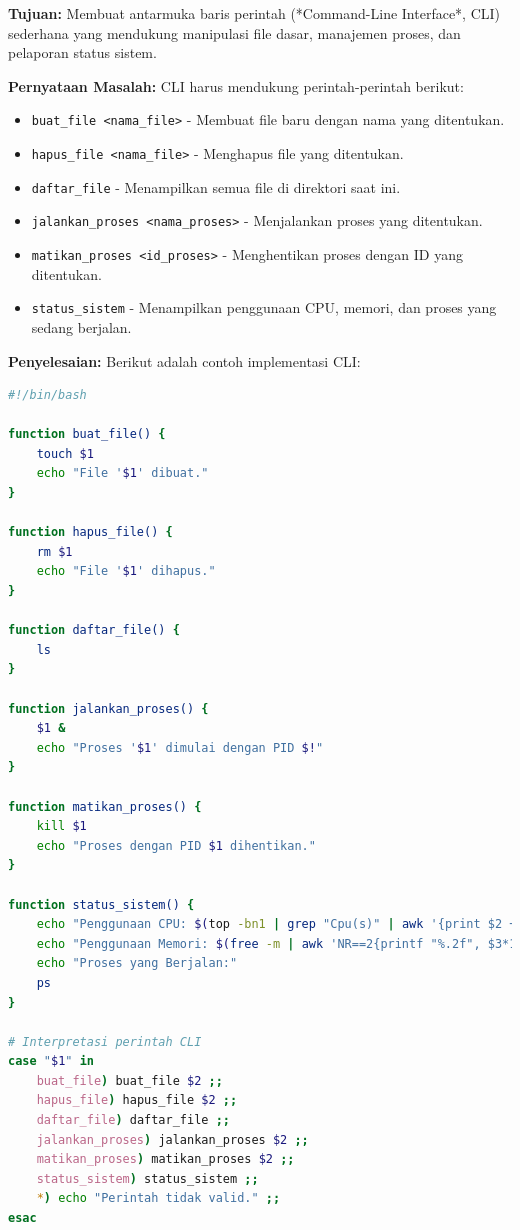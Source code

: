 \documentclass[12pt]{article}
\begin{document}
\textbf{Tujuan:}  
Membuat antarmuka baris perintah (*Command-Line Interface*, CLI) sederhana yang mendukung manipulasi file dasar, manajemen proses, dan pelaporan status sistem.

\textbf{Pernyataan Masalah:}  
CLI harus mendukung perintah-perintah berikut:
\begin{itemize}
    \item \texttt{buat\_file <nama\_file>} - Membuat file baru dengan nama yang ditentukan.
    \item \texttt{hapus\_file <nama\_file>} - Menghapus file yang ditentukan.
    \item \texttt{daftar\_file} - Menampilkan semua file di direktori saat ini.
    \item \texttt{jalankan\_proses <nama\_proses>} - Menjalankan proses yang ditentukan.
    \item \texttt{matikan\_proses <id\_proses>} - Menghentikan proses dengan ID yang ditentukan.
    \item \texttt{status\_sistem} - Menampilkan penggunaan CPU, memori, dan proses yang sedang berjalan.
\end{itemize}

\textbf{Penyelesaian:}  
Berikut adalah contoh implementasi CLI:

\begin{lstlisting}[language=bash, caption=Contoh skrip CLI sederhana]
#!/bin/bash

function buat_file() {
    touch $1
    echo "File '$1' dibuat."
}

function hapus_file() {
    rm $1
    echo "File '$1' dihapus."
}

function daftar_file() {
    ls
}

function jalankan_proses() {
    $1 &
    echo "Proses '$1' dimulai dengan PID $!"
}

function matikan_proses() {
    kill $1
    echo "Proses dengan PID $1 dihentikan."
}

function status_sistem() {
    echo "Penggunaan CPU: $(top -bn1 | grep "Cpu(s)" | awk '{print $2 + $4}')%"
    echo "Penggunaan Memori: $(free -m | awk 'NR==2{printf "%.2f", $3*100/$2 }')%"
    echo "Proses yang Berjalan:"
    ps
}

# Interpretasi perintah CLI
case "$1" in
    buat_file) buat_file $2 ;;
    hapus_file) hapus_file $2 ;;
    daftar_file) daftar_file ;;
    jalankan_proses) jalankan_proses $2 ;;
    matikan_proses) matikan_proses $2 ;;
    status_sistem) status_sistem ;;
    *) echo "Perintah tidak valid." ;;
esac
\end{lstlisting}
\end{document}
